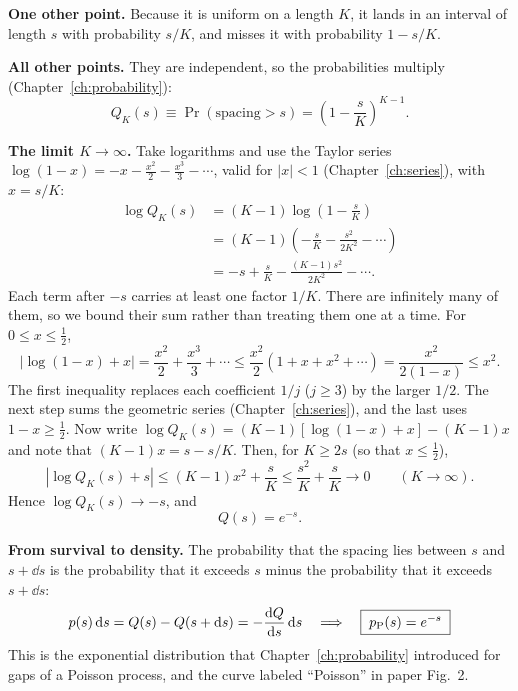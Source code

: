 \textbf{One other point.} Because it is uniform on a length $K$, it lands in an interval of length $s$ with probability $s/K$, and misses it with probability $1-s/K$.

\textbf{All other points.} They are independent, so the probabilities multiply (Chapter~\ref{ch:probability}):
\begin{equation}
Q_K(s)\equiv\Pr(\text{spacing}>s)=\left(1-\frac{s}{K}\right)^{K-1}.
\end{equation}

\textbf{The limit $K\to\infty$.} Take logarithms and use the Taylor series $\log(1-x)=-x-\tfrac{x^2}{2}-\tfrac{x^3}{3}-\cdots$, valid for $|x|<1$ (Chapter~\ref{ch:series}), with $x=s/K$:
\begin{align}
\log Q_K(s)&=(K-1)\log\left(1-\frac sK\right)\nonumber\\
&=(K-1)\left(-\frac sK-\frac{s^2}{2K^2}-\cdots\right)\nonumber\\
&=-s+\frac sK-\frac{(K-1)s^2}{2K^2}-\cdots .
\end{align}
Each term after $-s$ carries at least one factor $1/K$. There are infinitely many of them, so we bound their sum rather than treating them one at a time. For $0\le x\le\tfrac12$,
\begin{equation}
\left|\log(1-x)+x\right|=\frac{x^2}{2}+\frac{x^3}{3}+\cdots\le\frac{x^2}{2}\left(1+x+x^2+\cdots\right)=\frac{x^2}{2(1-x)}\le x^2 .
\end{equation}
The first inequality replaces each coefficient $1/j$ ($j\ge3$) by the larger $1/2$. The next step sums the geometric series (Chapter~\ref{ch:series}), and the last uses $1-x\ge\tfrac12$. Now write $\log Q_K(s)=(K-1)\left[\log(1-x)+x\right]-(K-1)x$ and note that $(K-1)x=s-s/K$. Then, for $K\ge2s$ (so that $x\le\tfrac12$),
\begin{equation}
\left|\log Q_K(s)+s\right|\le(K-1)x^2+\frac sK\le\frac{s^2}{K}+\frac sK\to0\qquad(K\to\infty).
\end{equation}
Hence $\log Q_K(s)\to-s$, and
\begin{equation}
Q(s)=e^{-s}.
\label{eq:level-statistics-survival}
\end{equation}

\textbf{From survival to density.} The probability that the spacing lies between $s$ and $s+\dd s$ is the probability that it exceeds $s$ minus the probability that it exceeds $s+\dd s$:
\begin{equation}
p(s)\,\mathrm{d} s=Q(s)-Q(s+\mathrm{d} s)=-\frac{\mathrm{d} Q}{\mathrm{d} s}\,\mathrm{d} s
\quad\Longrightarrow\quad
\boxed{\;p_{\rm P}(s)=e^{-s}\;}
\label{eq:level-statistics-poisson}
\end{equation}
This is the exponential distribution that Chapter~\ref{ch:probability} introduced for gaps of a Poisson process, and the curve labeled ``Poisson'' in paper Fig.~2.

